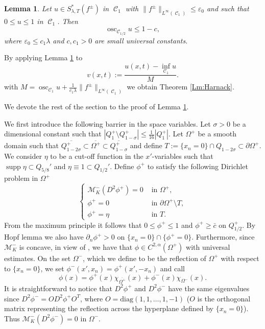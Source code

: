 \documentclass[12pt]{article}
\numberwithin{Theorem}{section}
\newtheorem{Lemma}[Theorem]{Lemma}
\theoremstyle{definition}
\theoremstyle{remark}
\numberwithin{equation}{section}
\DeclareMathOperator{\C}{\mathcal{C}}
\DeclareMathOperator*{\supp}{supp}
\newcommand{\Mm}{\mathcal{M}_{K}^{-}}
\newcommand{\p}{\partial}
\newcommand{\osc}{\operatorname{osc}}
\newcommand{\eps}{\varepsilon}
\begin{document}
\begin{Lemma}\label{Lm:Harnack1}
    Let $u\in S^*_{\lambda,T}(f^{\pm})$  in $\C_1$  with $\|f^\pm\|_{L^\infty(\C_1)} \leq \varepsilon_0$ and such that $0\leq u  \leq 1$ in $\C_1$.  Then 
\[
\osc_{\C_{1/2}} u \leq 1-c,
\]
 where $\eps_0\leq c_1 \lambda$ and $c,c_1>0$ are small universal constants.
\end{Lemma}

By applying Lemma \ref{Lm:Harnack1} to 
\[
v(x,t) := \frac{u(x,t) - \inf_{\C_1} u}{M}.
\]
with $M= \osc_{\C_1} u + \frac{1}{c_1 \lambda}\|f^\pm\|_{L^\infty(\C_1)}$ we obtain Theorem \ref{Lm:Harnack}. 

We devote the rest of the section to the proof of Lemma \ref{Lm:Harnack1}.
 
We first introduce the following barrier in the space variables.
Let $\sigma>0$ be a dimensional constant such that $|Q_1^+\setminus Q_{1-\sigma}^+| \leq \frac{1}{16}|Q_1^+|$. Let $\Omega^+$ be a smooth domain such that $ \overline{Q_{1-2\sigma}^+} \subset  \overline{\Omega^+} \subset \overline{Q_{1-\sigma}^+} $ and define $T:= \{ x_n=0 \} \cap Q_{1-2\sigma} \subset \p \Omega^+$.
We consider $\eta$ to be a cut-off function in the $x'$-variables such that $\supp \eta \subset Q_{5/8}'$ and $ \eta \equiv 1 \subset Q_{1/2}'$. Define $\phi^+$ to satisfy the following Dirichlet problem in $\Omega^+$
\begin{equation} \label{eq:barrierphi}
\begin{cases}
           \mathcal M_K^- (D^2 \phi^+) = 0 & \text{ in }\Omega^+,\\
        \phi^+ =0  & \text{ in }\p \Omega^+ \setminus T, \\
        \phi^{+} = \eta  & \text{ in } T.
\end{cases}
\end{equation}
From the maximum principle it follows that $0 \leq \phi^+ \leq 1$ and $\phi^+ \geq \bar c$ on $Q_{1/2}^+$. By Hopf lemma we also have $\p_n \phi^+ >0$ on $\{ x_n = 0\} \cap \{ \phi^+ =0\}$. Furthermore, since $\Mm$ is concave, in view of \cite[Chapter $9$]{CC}, we have that $\phi \in C^{2,{ \alpha}}(\Omega^+)$ with universal estimates. 
On the set $\Omega^{-}$, which we define to be the reflection of $\Omega^+$ with respect to $\{x_n=0\}$, we set $\phi^{-}(x',x_n)=\phi^{+}(x',-x_n)$ and call
\[
\phi(x) = \phi^+(x) \chi_{\overline{\Omega^+}}(x) + \phi^-(x) \chi_{\Omega^-}(x).
\]
It is straightforward to notice that $D^2 \phi^+$ and $D^2 \phi^-$ have the same eigenvalues since $D^2\phi^- = OD^2\phi^+O^T $, where $O = \text{diag}(1, 1, \dots, 1, -1)$ ($O$ is the orthogonal matrix representing the reflection across the hyperplane defined by $\{x_n=0\}$). Thus $ \mathcal M_K^- (D^2 \phi^-)=0$ in $\Omega^-$.
\end{document}

